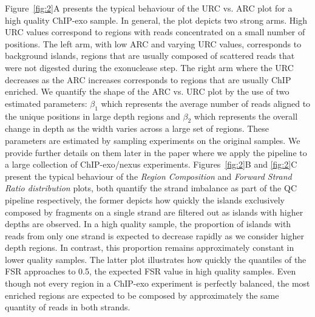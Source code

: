 \documentclass{bmcart}
\newcommand{\SK}[1]{\textcolor{red}{SK: #1}}
\newcommand{\RW}[1]{\textcolor{blue}{RW: #1}}
\begin{document}
Figure~\ref{fig:2}A presents the typical behaviour of the URC vs. ARC plot for a high quality ChIP-exo sample. In general, the plot depicts two strong arms. High URC values correspond to regions with reads concentrated on a small number of positions.  The left arm, with low ARC and varying URC values, corresponds to background islands, regions that are usually composed of scattered reads that were not digested during the exonuclease step. The right arm where the URC decreases as the ARC increases corresponds to regions that are usually ChIP enriched. We quantify the shape of the ARC vs. URC plot by the use of two estimated parameters: $\beta_1$ which represents the average number of reads aligned to the unique positions in large depth regions and $\beta_2$ which represents the overall change in depth as the width varies across a large set of regions. These parameters are estimated by sampling experiments on the original samples. We provide further details on them later in the paper where we apply the pipeline to a large collection of ChIP-exo/nexus experiments. Figures~\ref{fig:2}B and \ref{fig:2}C   present the typical behaviour of the \textit{Region Composition} and \textit{Forward Strand Ratio distribution} plots, both quantify the strand imbalance as part of the QC pipeline respectively, the former depicts how quickly the islands exclusively composed by fragments on a single strand are filtered out as islands with higher depths are observed. In a high quality sample, the proportion of islands with reads from only one strand is expected to decrease rapidly as we consider higher depth regions. In contrast, this proportion remains approximately constant in lower quality samples. The latter plot illustrates how quickly the quantiles of the FSR approaches to 0.5, the expected FSR value in high quality samples. Even though not every region in a ChIP-exo experiment is perfectly balanced, the most enriched regions are expected to be composed by approximately the same quantity of reads in both strands.
\end{document}
